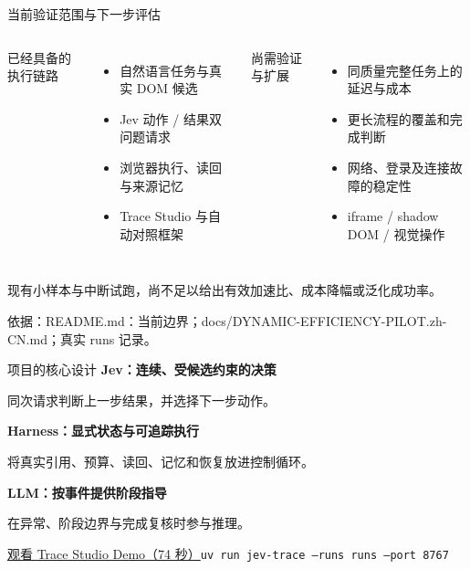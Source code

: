 \documentclass[aspectratio=169,11pt]{beamer}
\newcommand{\src}[1]{\par\vfill{\fontsize{6.5}{8}\selectfont\color{Muted}依据：#1\par}}
\newcommand{\lead}[1]{{\large\color{Green}#1}\par\vspace{3mm}}
\newcommand{\key}[1]{\textbf{\color{Green}#1}}
\newcommand{\gap}{\par\vspace{1.8mm}}
\begin{document}
\begin{frame}{当前验证范围与下一步评估}
\begin{columns}[T,onlytextwidth]
\lead{已经具备的执行链路}
\begin{itemize}\setlength\itemsep{2.5mm}
\item 自然语言任务与真实 DOM 候选
\item Jev 动作 / 结果双问题请求
\item 浏览器执行、读回与来源记忆
\item Trace Studio 与自动对照框架
\end{itemize}
\lead{尚需验证与扩展}
\begin{itemize}\setlength\itemsep{2.5mm}
\item 同质量完整任务上的延迟与成本
\item 更长流程的覆盖和完成判断
\item 网络、登录及连接故障的稳定性
\item iframe / shadow DOM / 视觉操作
\end{itemize}
\end{columns}
\gap
\alert{现有小样本与中断试跑，尚不足以给出有效加速比、成本降幅或泛化成功率。}
\src{README.md：当前边界；docs/DYNAMIC-EFFICIENCY-PILOT.zh-CN.md；真实 runs 记录。}
\end{frame}

\begin{frame}{项目的核心设计}
\vspace{2mm}
{\LARGE\key{Jev：连续、受候选约束的决策}}\par\gap
{\large 同次请求判断上一步结果，并选择下一步动作。}\par\vspace{6mm}
{\LARGE\key{Harness：显式状态与可追踪执行}}\par\gap
{\large 将真实引用、预算、读回、记忆和恢复放进控制循环。}\par\vspace{6mm}
{\LARGE\key{LLM：按事件提供阶段指导}}\par\gap
{\large 在异常、阶段边界与完成复核时参与推理。}\par
\vfill
\small\href{run:demo.mp4}{观看 Trace Studio Demo（74 秒）}\hspace{7mm}\texttt{uv run jev-trace --runs runs --port 8767}
\end{frame}
\end{document}

